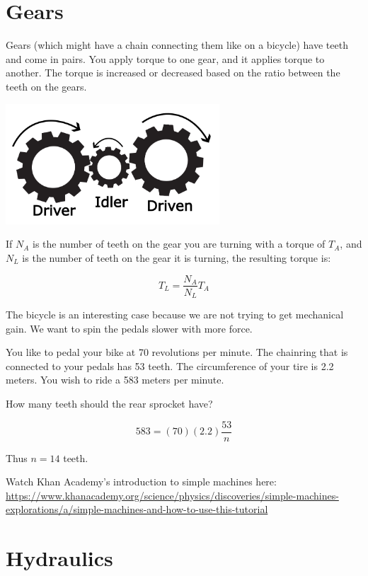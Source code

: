 \section{Gears}

Gears (which might have a chain connecting them like on a bicycle)
have teeth and come in pairs. You apply torque to one gear, and it
applies torque to another. The torque is increased or decreased based
on the ratio between the teeth on the gears.


\includegraphics[width=0.6\textwidth]{Gears.png}


If $N_A$ is the number of teeth on the gear you are turning with a
torque of $T_A$, and $N_L$ is the number of teeth on the gear it is
turning, the resulting torque is:

$$T_L = \frac{N_A}{N_L} T_A$$


\begin{Exercise}[title={Gears}, label=gear]

The bicycle is an interesting case because we are not trying to get
mechanical gain. We want to spin the pedals slower with more force.
  
You like to pedal your bike at 70 revolutions per minute. The
chainring that is connected to your pedals has 53 teeth. The
circumference of your tire is 2.2 meters. You wish to ride a 583 meters
per minute.

How many teeth should the rear sprocket have?
  
\end{Exercise}
\begin{Answer}[ref=ramp]
  
  $$583 = (70)(2.2)\frac{53}{n}$$
  
Thus $n = 14$ teeth.
\end{Answer}

Watch Khan Academy's introduction to simple machines here: \url{https://www.khanacademy.org/science/physics/discoveries/simple-machines-explorations/a/simple-machines-and-how-to-use-this-tutorial}

\section{Hydraulics}


